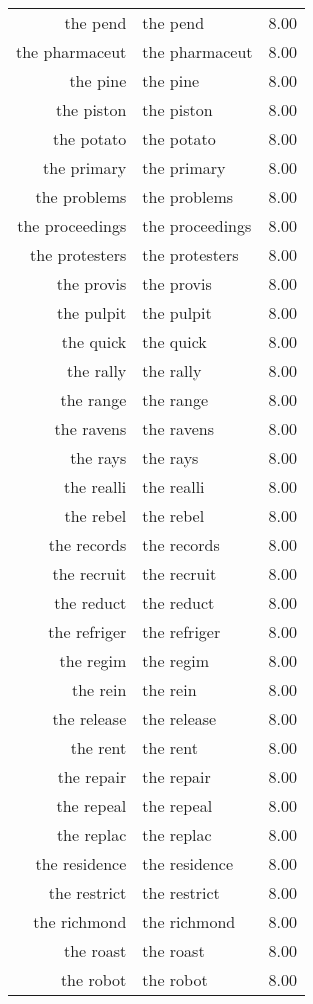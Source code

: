 \begin{table}[ht]
\begin{tabular}{rlr}
  the pend & the pend & 8.00 \\ 
  the pharmaceut & the pharmaceut & 8.00 \\ 
  the pine & the pine & 8.00 \\ 
  the piston & the piston & 8.00 \\ 
  the potato & the potato & 8.00 \\ 
  the primary & the primary & 8.00 \\ 
  the problems & the problems & 8.00 \\ 
  the proceedings & the proceedings & 8.00 \\ 
  the protesters & the protesters & 8.00 \\ 
  the provis & the provis & 8.00 \\ 
  the pulpit & the pulpit & 8.00 \\ 
  the quick & the quick & 8.00 \\ 
  the rally & the rally & 8.00 \\ 
  the range & the range & 8.00 \\ 
  the ravens & the ravens & 8.00 \\ 
  the rays & the rays & 8.00 \\ 
  the realli & the realli & 8.00 \\ 
  the rebel & the rebel & 8.00 \\ 
  the records & the records & 8.00 \\ 
  the recruit & the recruit & 8.00 \\ 
  the reduct & the reduct & 8.00 \\ 
  the refriger & the refriger & 8.00 \\ 
  the regim & the regim & 8.00 \\ 
  the rein & the rein & 8.00 \\ 
  the release & the release & 8.00 \\ 
  the rent & the rent & 8.00 \\ 
  the repair & the repair & 8.00 \\ 
  the repeal & the repeal & 8.00 \\ 
  the replac & the replac & 8.00 \\ 
  the residence & the residence & 8.00 \\ 
  the restrict & the restrict & 8.00 \\ 
  the richmond & the richmond & 8.00 \\ 
  the roast & the roast & 8.00 \\ 
  the robot & the robot & 8.00 \\ 

\end{tabular}
\end{table}
